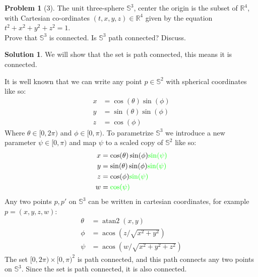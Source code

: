 \documentclass{article}
\theoremstyle{definition}
\newtheorem*{soln}{Solution}
\newtheorem*{prob}{Problem}
\theoremstyle{theorem}
\renewcommand{\S}{\mathbb{S}}
\newcommand{\atan}{\operatorname{atan2}}
\newcommand{\acos}{\operatorname{acos}}
\begin{document}
\begin{prob}[3]
The unit three-sphere $\mathbb{S}^3$, center the origin is the subset of $\mathbb{R}^4$, with Cartesian co-ordinates $(t, x, y, z) \in \mathbb{R}^4$ given by the equation $t^2 + x^2 + y^2 + z^2 = 1$.  \\Prove that $\mathbb{S}^3$ is connected.  Is $\mathbb{S}^3$ path connected?  Discuss.
\end{prob}
\begin{soln}
    We will show that the set is path connected, this means it is connected. 

    It is well known that we can write any point  $p\in \S^2$ with spherical coordinates like so:
    \begin{align*}
        x&= \cos(\theta)\sin(\phi)\\
        y&=\sin(\theta)\sin(\phi)\\
        z&= \cos(\phi)
    \end{align*}
    Where $\theta\in [0,2\pi)$ and $\phi\in [0,\pi)$. To parametrize $\S^3$ we introduce a new parameter $\psi\in [0,\pi)$ and map  $\psi$ to a scaled copy of $\S^2$ like so:
    \begin{align*}
        x&= \cos(\theta)\sin(\phi)\textcolor{green}{\sin(\psi)}\\
        y&=\sin(\theta)\sin(\phi)\textcolor{green}{\sin(\psi)}\\
        z&= \cos(\phi)\textcolor{green}{\sin(\psi)}\\
        w&= \textcolor{green}{\cos(\psi)}
    \end{align*}
    Any two points $p,p'$  on $\S^3$ can be written in cartesian coordinates, for example $p=(x,y,z,w)$:
    \begin{align*}
        \theta&= \atan(x,y)\\
        \phi &= \acos\left(z/\sqrt{x^2+y^2}\right)\\
        \psi &= \acos\left(w/\sqrt{x^2+y^2+z^2}\right)
    \end{align*}
    The set $[0,2\pi)\times[0,\pi)^2$ is path connected, and this path connects any two points on $\S^3$.  Since the set is path connected, it is also connected.

\end{soln}
\vspace{1in}
\end{document}
